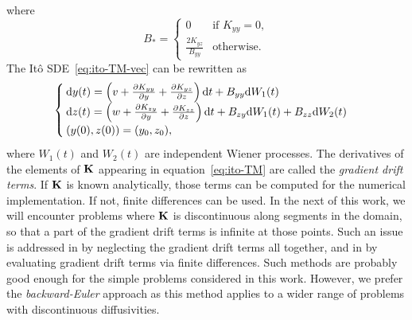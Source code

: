 where
\begin{equation} \label{eq:Bstar}
	B_* = \left\{ 
		\begin{array}{lr}
			0 & \mbox{if } K_{yy} = 0,\\
			\frac{2K_{yz}}{B_{yy}} & \mbox{otherwise}.
		\end{array}
	\right.
\end{equation}
The Itô SDE~\eqref{eq:ito-TM-vec} can be rewritten as
\begin{equation} \label{eq:ito-TM}
	\begin{cases}
		\rm dy(t) = \left(v + \frac{\partial K_{yy}}{\partial y} + \frac{\partial K_{yz}}{\partial z} \right) \rm dt + B_{yy} \rm dW_1(t)\\
		\rm dz(t) = \left(w + \frac{\partial K_{zy}}{\partial y} + \frac{\partial K_{zz}}{\partial z} \right) \rm dt + B_{zy} \rm dW_1(t) + B_{zz} \rm dW_2(t)\\
		(y(0),z(0)) = (y_0,z_0),
	\end{cases}
\end{equation}
where $W_1(t)$ and $W_2(t)$ are independent Wiener processes. The derivatives of the elements of $\b K$ appearing in equation~\eqref{eq:ito-TM} are called the \textit{gradient drift terms}. If $\b K$ is known analytically, those terms can be computed for the numerical implementation. If not, finite differences can be used. In the next of this work, we will encounter problems where $\b K$ is discontinuous along segments in the domain, so that a part of the gradient drift terms is infinite at those points.
Such an issue is addressed in \cite{prickett1981random} by neglecting the gradient drift terms all together, and in \cite{tompson1987numerical} by evaluating gradient drift terms via finite differences. Such methods are probably good enough for the simple problems considered in this work.
However, we prefer the \textit{backward-Euler} approach as this method applies to a wider range of problems with discontinuous diffusivities.



